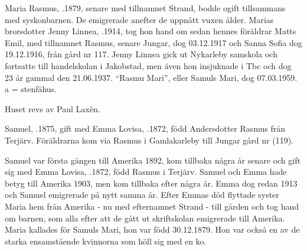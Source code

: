 %


%
Maria Rasmus, .1879, senare med tillnamnet Strand, bodde ogift tillsammans med syskonbarnen. De emigrerade anefter de uppnått vuxen ålder. Marias brorsdotter Jenny Linnea, .1914, tog hon hand om sedan hennes föräldrar Matts Emil, med tillnamnet Rasmus, senare Jungar, dog 03.12.1917 och Sanna Sofia dog 19.12.1916, från	gård nr 117. Jenny Linnea gick ut Nykarleby samskola och fortsatte till handelskolan i Jakobstad, men även hon insjuknade i Tbc och dog 23 år gammal den 21.06.1937. ``Rasmu Mari'', eller Samuls Mari, dog 07.03.1959. a = stenfähus.

Huset revs av Paul Laxèn.

%
Samuel, .1875, gift med Emma Lovisa, .1872, född Andersdotter Rasmus från Terjärv. Föräldrarna kom via Rasmus i Gamlakarleby till Jungar gård nr (119).
\begin{jhchildren}
  \item {}
  \item {}
  \item {}
  \item {}
  \item {}
  \item {}
\end{jhchildren}
Samuel var första gången till Amerika 1892, kom tillbaka några år senare och gift sig med Emma Lovisa, .1872, född Rasmus i Terjärv. Samuel och Emma hade betyg till Amerika 1903, men kom tillbaka efter några år. Emma dog redan 1913 och Samuel emigrerade på nytt samma år. Efter Emmas död flyttade syster Maria hem från Amerika - nu med efternamnet Strand - till gården och tog hand om barnen, som alla	efter att de gått ut skriftskolan emigrerade till Amerika. Maria kallades för Samuls Mari, hon var född 30.12.1879. Hon var också en av de starka ensamstående kvinnorna som höll sig med en ko.


